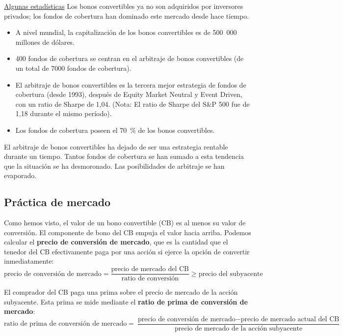 \underline{Algunas estadísticas}
Los bonos convertibles ya no son adquiridos por inversores privados; los fondos de cobertura han dominado este mercado desde hace tiempo.
\begin{itemize}
    \item A nivel mundial, la capitalización de los bonos convertibles es de 500 000 millones de dólares.
    \item 400 fondos de cobertura se centran en el arbitraje de bonos convertibles (de un total de 7000 fondos de cobertura).
    \item El arbitraje de bonos convertibles es la tercera mejor estrategia de fondos de cobertura (desde 1993), después de Equity Market Neutral y Event Driven, con un ratio de Sharpe de 1,04. (Nota: El ratio de Sharpe del S\&P 500 fue de 1,18 durante el mismo período).
    \item Los fondos de cobertura poseen el 70 \% de los bonos convertibles.
\end{itemize}
El arbitraje de bonos convertibles ha dejado de ser una estrategia rentable durante un tiempo. Tantos fondos de cobertura se han sumado a esta tendencia que la situación se ha desmoronado. Las posibilidades de arbitraje se han evaporado.



\subsection{Práctica de mercado}

Como hemos visto, el valor de un bono convertible (CB) es al menos su valor de conversión. El componente de bono del CB empuja el valor hacia arriba. Podemos calcular el \textbf{precio de conversión de mercado}, que es la cantidad que el tenedor del CB efectivamente paga por una acción si ejerce la opción de convertir inmediatamente:
\begin{equation*}
    \text{precio de conversión de mercado} = \frac{\text{precio de mercado del CB}}{\text{ratio de conversión}} \geq \text{precio del subyacente}
\end{equation*}

El comprador del CB paga una prima sobre el precio de mercado de la acción subyacente. Esta prima se mide mediante el \textbf{ratio de prima de conversión de mercado}:
\begin{equation*}
    \text{ratio de prima de conversión de mercado} = \frac{\text{precio de conversión de mercado} - \text{precio de mercado actual del CB}}{\text{precio de mercado de la acción subyacente}}
\end{equation*}

